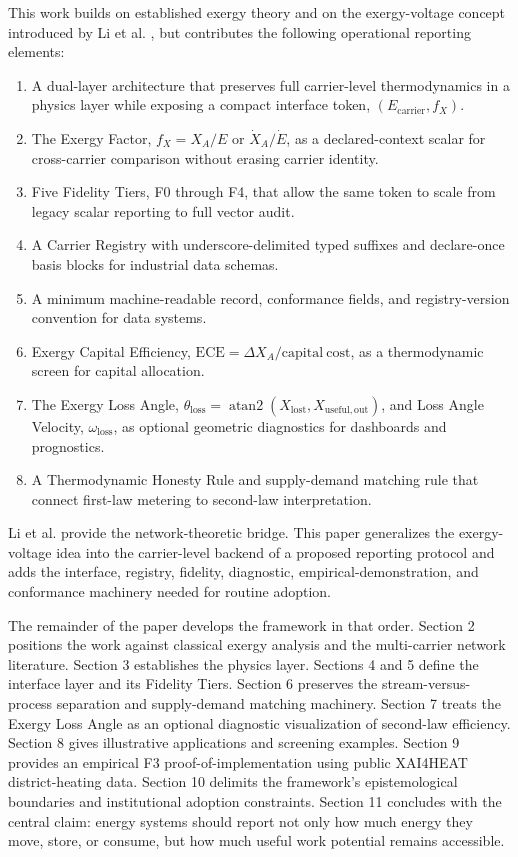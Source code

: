 \documentclass[11pt]{article}
\newcommand{\fx}{f_X}
\newcommand{\XA}{X_A}
\newcommand{\XdotA}{\dot{X}_A}
\newcommand{\thetaloss}{\theta_{\mathrm{loss}}}
\newcommand{\omegaloss}{\omega_{\mathrm{loss}}}
\begin{document}
This work builds on established exergy theory and on the exergy-voltage concept introduced by Li et al. \cite{li2022}, but contributes the following operational reporting elements:
\begin{enumerate}[leftmargin=1.4em]
\item A dual-layer architecture that preserves full carrier-level thermodynamics in a physics layer while exposing a compact interface token, $(E_{\mathrm{carrier}},\fx)$.
\item The Exergy Factor, $\fx=\XA/E$ or $\XdotA/\dot{E}$, as a declared-context scalar for cross-carrier comparison without erasing carrier identity.
\item Five Fidelity Tiers, F0 through F4, that allow the same token to scale from legacy scalar reporting to full vector audit.
\item A Carrier Registry with underscore-delimited typed suffixes and declare-once basis blocks for industrial data schemas.
\item A minimum machine-readable record, conformance fields, and registry-version convention for data systems.
\item Exergy Capital Efficiency, $\mathrm{ECE}=\Delta X_A/\mathrm{capital\ cost}$, as a thermodynamic screen for capital allocation.
\item The Exergy Loss Angle, $\thetaloss=\operatorname{atan2}(X_{\mathrm{lost}},X_{\mathrm{useful,out}})$, and Loss Angle Velocity, $\omegaloss$, as optional geometric diagnostics for dashboards and prognostics.
\item A Thermodynamic Honesty Rule and supply-demand matching rule that connect first-law metering to second-law interpretation.
\end{enumerate}
Li et al. provide the network-theoretic bridge. This paper generalizes the exergy-voltage idea into the carrier-level backend of a proposed reporting protocol and adds the interface, registry, fidelity, diagnostic, empirical-demonstration, and conformance machinery needed for routine adoption.

The remainder of the paper develops the framework in that order. Section 2 positions the work against classical exergy analysis and the multi-carrier network literature. Section 3 establishes the physics layer. Sections 4 and 5 define the interface layer and its Fidelity Tiers. Section 6 preserves the stream-versus-process separation and supply-demand matching machinery. Section 7 treats the Exergy Loss Angle as an optional diagnostic visualization of second-law efficiency. Section 8 gives illustrative applications and screening examples. Section 9 provides an empirical F3 proof-of-implementation using public XAI4HEAT district-heating data. Section 10 delimits the framework's epistemological boundaries and institutional adoption constraints. Section 11 concludes with the central claim: energy systems should report not only how much energy they move, store, or consume, but how much useful work potential remains accessible.
\end{document}
